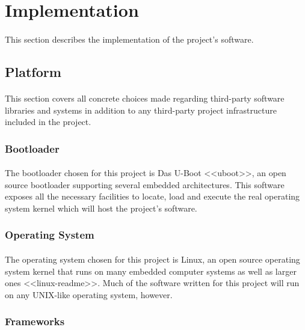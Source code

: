 \section{Implementation}

\paragraph{}
This section describes the implementation of the project's software.

\subsection{Platform}

\paragraph{}
This section covers all concrete choices made regarding third-party software libraries and systems in addition to any third-party project infrastructure included in the project.

\subsubsection{Bootloader}

\paragraph{}
The bootloader chosen for this project is Das U-Boot <<uboot>>, an open source bootloader supporting several embedded architectures.
This software exposes all the necessary facilities to locate, load and execute the real operating system kernel which will host the project's software.

\subsubsection{Operating System}

\paragraph{}
The operating system chosen for this project is Linux, an open source operating system kernel that runs on many embedded computer systems as well as larger ones <<linux-readme>>.
Much of the software written for this project will run on any UNIX-like operating system, however.

\subsubsection{Frameworks}

